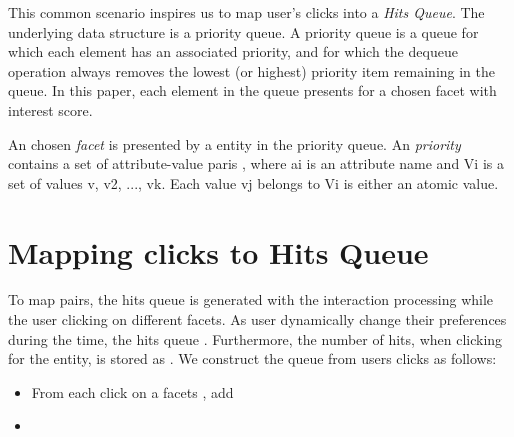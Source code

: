 This common scenario inspires us to map user's clicks into a {\it Hits Queue}. The underlying data structure is a priority queue. A priority queue is a queue for which each element has an associated priority, and for which the dequeue operation always removes the lowest (or highest) priority item remaining in the queue. In this paper, each element in the queue presents for a chosen facet with interest score. 

An chosen {\it facet} is presented by a entity in the priority queue. An {\it priority} contains a set of attribute-value paris , where ai is an attribute name and Vi is a set of values {v, v2, ..., vk}. Each value vj belongs to Vi is either an atomic value. 

\section{Mapping clicks to Hits Queue}

To map  pairs, the hits queue is generated with the interaction processing while the user clicking on different facets. As user dynamically change their preferences during the time, the hits queue . Furthermore, the number of hits, when clicking for the entity, is stored as . We construct the queue from users clicks as follows:
\begin{itemize}
\item From each click  on a facets , add 
\item 
\end{itemize}


